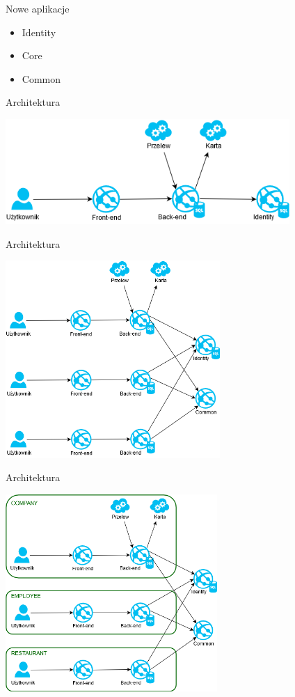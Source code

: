 \documentclass{beamer}
\begin{document}
\begin{frame}{Nowe aplikacje}
	\begin{huge}
		\begin{itemize}[<+->]
			\item Identity
			\item Core
			\item Common
		\end{itemize}
	\end{huge}
\end{frame}

\begin{frame}{Architektura}
	\begin{center}
		\includegraphics[height=4cm]{architektura1.png}
	\end{center}
\end{frame}

\begin{frame}{Architektura}
	\begin{center}
		\includegraphics[height=7.5cm]{architektura2.png}
	\end{center}
\end{frame}

\begin{frame}{Architektura}
	\begin{center}
		\includegraphics[height=7.5cm]{architektura4.png}
	\end{center}
\end{frame}
\end{document}
